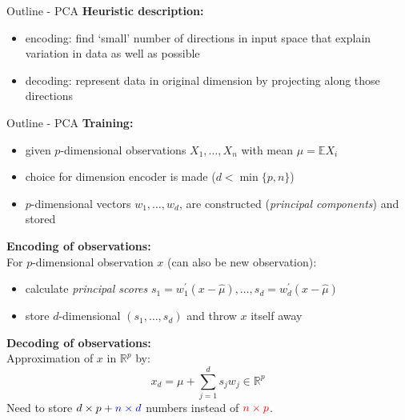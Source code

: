\documentclass[pdf, handout]{beamer}
\begin{document}
\begin{frame}{Outline - PCA}
\textbf{Heuristic description:} \\
\begin{itemize}
\item encoding: find `small' number of directions in input space that explain variation in data as well as possible
\item decoding: represent data in original dimension by projecting along those directions
\end{itemize}
\end{frame}

\begin{frame}{Outline - PCA}
\vspace{-.1cm}
\textbf{Training:}
\begin{itemize}
\item given $p$-dimensional observations $X_1,\dots,X_n$ with mean $\mu=\mathbb{E}X_i$
\item choice for dimension encoder is made ($d< \min\{p, n\}$)
\item $p$-dimensional vectors $w_1,\dots,w_d$,  are constructed (\emph{principal components}) and stored
\end{itemize}
\textbf{Encoding of observations:} \\
For  $p$-dimensional observation $x$ (can also be new observation):
\begin{itemize}
\item calculate \emph{principal scores}  $s_1 = w_1^\prime (x-\hat\mu),\dots, s_d=w_d^\prime (x-\hat\mu)$
\item store $d$-dimensional $(s_1,\dots,s_d)$ and throw $x$ itself away
\end{itemize}
\textbf{Decoding of observations:} \\
Approximation of $x$ in $\mathbb{R}^p$  by:
\[
x_d  = \mu + \sum_{j=1}^d s_j w_j  \in\mathbb{R}^p
\]
\vspace{.25cm}
Need to store $d\times p + \color{blue}{n\times d}$ numbers instead of 
$\color{red}{n\times p}$.
\end{frame}
\end{document}

